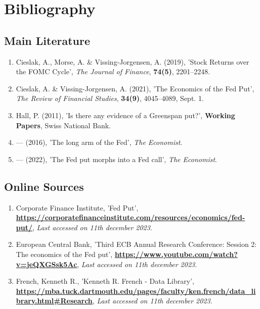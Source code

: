 \chapter*{Bibliography}

\section*{Main Literature}

\begin{enumerate}[label={},left=0pt]

    \item \label{item:cieslak_stock_2019} 
    Cieslak, A., Morse, A. \& Vissing-Jorgensen, A. (2019), 'Stock Returns over the FOMC Cycle', \textit{The Journal of Finance}, \textbf{74(5)}, 2201–2248.
    
    \item \label{item:cieslak_economics_2021} 
    Cieslak, A.  \& Vissing-Jorgensen, A. (2021), 'The Economics of the Fed Put', \textit{The Review of Financial Studies}, \textbf{34(9)}, 4045–4089, Sept. 1. 

    \item \label{item:hall_is_2011}
    Hall, P. (2011), 'Is there any evidence of a Greenspan put?', \textbf{Working Papers}, Swiss National Bank.

    \item \label{item:economist_2016}
    — (2016), 'The long arm of the Fed', \textit{The Economist}.

    \item \label{item:noauthor_fed_nodate} 
    — (2022), 'The Fed put morphs into a Fed call', \textit{The Economist}.

\end{enumerate}

\section*{Online Sources}
\begin{enumerate}[label={},left=0pt]

    \item \label{item:noauthor_fed_nodate-1} 
    Corporate Finance Institute,  'Fed Put',
    \textbf{\url{https://corporatefinanceinstitute.com/resources/economics/fed-put/}},
    \textit{Last accessed on 11th december 2023}.

    \item \label{item:european_central_bank_third_2018} 
    European Central Bank, 'Third ECB Annual Research Conference: Session 2: The economics of the Fed put', \textbf{\url{https://www.youtube.com/watch?v=jeQXGSsk5Ac}},
    \textit{Last accessed on 11th december 2023}.

    \item \label{item:french_kenneth_nodate} 
    French, Kenneth R.,  'Kenneth R. French - Data Library',
    \textbf{\url{https://mba.tuck.dartmouth.edu/pages/faculty/ken.french/data_library.html\#Research}},
    \textit{Last accessed on 11th december 2023}.
    

\end{enumerate}
